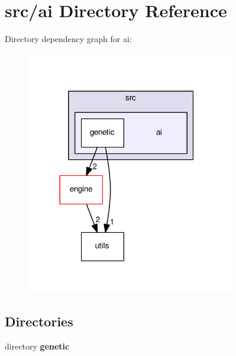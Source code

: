 \section{src/ai Directory Reference}
\label{dir_128a93aeeff33a8423f079f46929dbb3}
Directory dependency graph for ai\+:
\nopagebreak
\begin{figure}[H]
\begin{center}
\leavevmode
\includegraphics[width=257pt]{dir_128a93aeeff33a8423f079f46929dbb3_dep}
\end{center}
\end{figure}
\subsection*{Directories}
\begin{DoxyCompactItemize}
\item 
directory \textbf{ genetic}
\end{DoxyCompactItemize}

